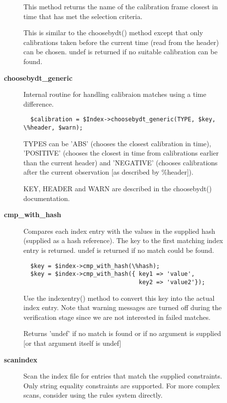 \begin{description}
\begin{description}
This method returns the name of the calibration frame closest in 
time that has met the selection criteria.



This is similar to the choosebydt() method except that only
calibrations taken before the current time (read from the
header) can be chosen. undef is returned if no suitable 
calibration can be found.


\item[{\textbf{choosebydt\_generic}}] \mbox{}

Internal routine for handling calibraion matches using a 
time difference.

\begin{verbatim}
  $calibration = $Index->choosebydt_generic(TYPE, $key, \%header, $warn);
\end{verbatim}


TYPES can be 'ABS' (chooses the closest calibration in time), 
'POSITIVE' (chooses the closest in time from calibrations earlier
than the current header) and 'NEGATIVE' (chooses calibrations after
the current observation [as described by \%header]).



KEY, HEADER and WARN are described in the choosebydt() documentation.


\item[{\textbf{cmp\_with\_hash}}] \mbox{}

Compares each index entry with the values in the supplied hash
(supplied as a hash reference). The key to the first matching 
index entry is returned. undef is returned if no match could be 
found.

\begin{verbatim}
  $key = $index->cmp_with_hash(\%hash);
  $key = $index->cmp_with_hash({ key1 => 'value',
                                 key2 => 'value2'});
\end{verbatim}


Use the indexentry() method to convert this key into the actual
index entry. Note that warning messages are turned off during the
verification stage since we are not interested in failed matches.



Returns 'undef' if no match is found or if no argument is supplied
[or that argument itself is undef]


\item[{\textbf{scanindex}}] \mbox{}

Scan the index file for entries that match the supplied constraints.
Only string equality constraints are supported. For more complex scans,
consider using the rules system directly.


\end{description}
\end{description}
